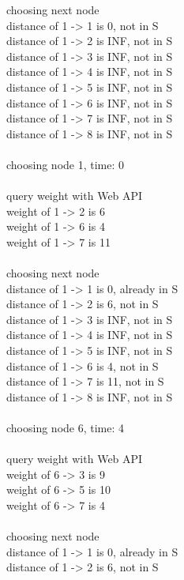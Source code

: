 \documentclass[14pt, a4paper]{article}
\begin{document}
\begin{enumerate}
\begin{enumerate}[label*=\arabic*]
\begin{tcolorbox}[enhanced jigsaw,breakable,pad at break*=1mm,colback=gray!10!white,frame hidden]
choosing next node\\
distance of 1 -> 1 is 0, not in S\\
distance of 1 -> 2 is INF, not in S\\
distance of 1 -> 3 is INF, not in S\\
distance of 1 -> 4 is INF, not in S\\
distance of 1 -> 5 is INF, not in S\\
distance of 1 -> 6 is INF, not in S\\
distance of 1 -> 7 is INF, not in S\\
distance of 1 -> 8 is INF, not in S\\
\\
choosing node 1, time: 0\\
\\
query weight with Web API\\
weight of 1 -> 2 is 6\\
weight of 1 -> 6 is 4\\
weight of 1 -> 7 is 11\\
\\
choosing next node\\
distance of 1 -> 1 is 0, already in S\\
distance of 1 -> 2 is 6, not in S\\
distance of 1 -> 3 is INF, not in S\\
distance of 1 -> 4 is INF, not in S\\
distance of 1 -> 5 is INF, not in S\\
distance of 1 -> 6 is 4, not in S\\
distance of 1 -> 7 is 11, not in S\\
distance of 1 -> 8 is INF, not in S\\
\\
choosing node 6, time: 4\\
\\
query weight with Web API\\
weight of 6 -> 3 is 9\\
weight of 6 -> 5 is 10\\
weight of 6 -> 7 is 4\\
\\
choosing next node\\
distance of 1 -> 1 is 0, already in S\\
distance of 1 -> 2 is 6, not in S\\

\end{tcolorbox}
\end{enumerate}
\end{enumerate}
\end{document}
